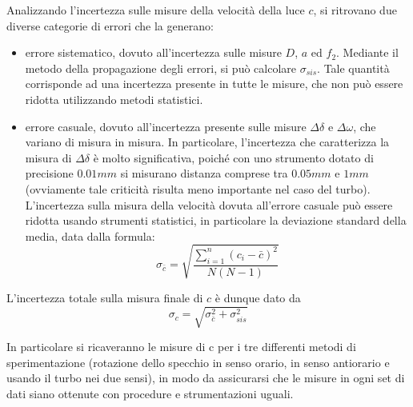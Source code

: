 Analizzando l'incertezza sulle misure della velocità della luce $c$, si ritrovano due diverse categorie di errori che la generano:
\begin{itemize}
    \item errore sistematico, dovuto all'incertezza sulle misure $D$, $a$ ed $f_2$. Mediante il metodo della propagazione degli errori, si può calcolare $\sigma_{sis}$.
    Tale quantità corrisponde ad una incertezza presente in tutte le misure, che non può essere ridotta utilizzando metodi statistici.
    
    \item errore casuale, dovuto all'incertezza presente sulle misure $\Delta\delta$ e $\Delta\omega$, che variano di misura in misura. In particolare, l'incertezza che caratterizza la misura di $\Delta\delta$ è molto significativa, poiché con uno strumento dotato di precisione $0.01mm$ si misurano distanza comprese tra $0. 05mm $ e $1mm$ (ovviamente tale criticità risulta meno importante nel caso del turbo).
    L'incertezza sulla misura della velocità dovuta all'errore casuale può essere ridotta usando strumenti statistici, in particolare la deviazione standard della media, data dalla formula:
    \begin{equation}
         \sigma_{\bar{c}}=\sqrt{\frac{\sum_{i=1}^{n} (c_i-\bar{c})^2}{N(N-1)}}
    \end{equation}
\end{itemize}

L'incertezza totale sulla misura finale di $c$ è dunque dato da
\begin{equation}
    \sigma_c=\sqrt{\sigma_{\bar{c}}^2+\sigma_{sis}^2}
\end{equation}

In particolare si ricaveranno le misure di c per i tre differenti metodi di sperimentazione (rotazione dello specchio in senso orario, in senso antiorario e usando il turbo nei due sensi), in modo da assicurarsi che le misure in ogni set di dati siano ottenute con procedure e strumentazioni uguali.
